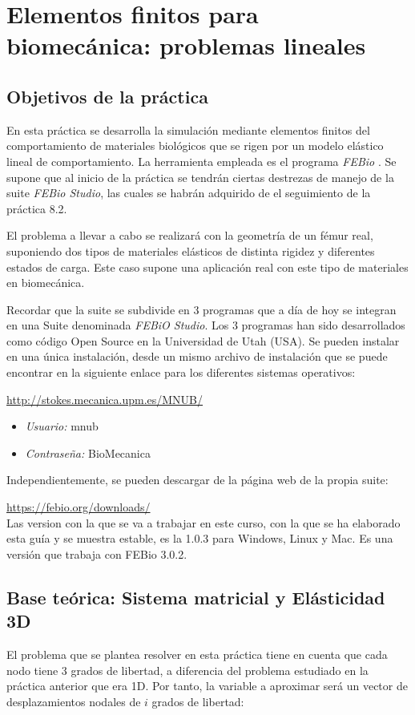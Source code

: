 \chapter{Elementos finitos para biomecánica: problemas lineales}
\label{cap2}

\section{Objetivos de la práctica}
\label{sec:objetivos}

En esta práctica se desarrolla la simulación mediante elementos finitos del comportamiento de materiales biológicos que se rigen por un modelo elástico lineal de comportamiento. La herramienta empleada es el programa \emph{FEBio} \cite{FEBiO}. Se supone que al inicio de la práctica se tendrán ciertas destrezas de manejo de la suite \emph{FEBio Studio}, las cuales se habrán adquirido de el seguimiento de la práctica 8.2. 

El problema a llevar a cabo se realizará con la geometría de un fémur real, suponiendo dos tipos de materiales elásticos de distinta rigidez y diferentes estados de carga. Este caso supone una aplicación real con este tipo de materiales en biomecánica. 

Recordar que la suite se subdivide en 3 programas que a día de hoy se integran en una Suite denominada \emph{FEBiO Studio}.  Los 3 programas han sido desarrollados como código Open Source en la Universidad de Utah (USA). Se pueden instalar en una única instalación, desde un mismo archivo de instalación que se puede encontrar en la siguiente enlace para los diferentes sistemas operativos:

\url{http://stokes.mecanica.upm.es/MNUB/}
\begin{itemize}
\item \emph{Usuario:} mnub
\item \emph{Contraseña:} BioMecanica
\end{itemize}

Independientemente, se pueden descargar de la página web de la propia suite:

\url{https://febio.org/downloads/}\\

Las version con la que se va a trabajar en este curso, con la que se ha elaborado esta guía y se muestra estable, es la 1.0.3 para Windows, Linux y Mac. Es una versión que trabaja con FEBio 3.0.2.

\section{Base teórica: Sistema matricial y Elásticidad 3D}
\label{sec:teoria}
El problema que se plantea resolver en esta práctica tiene en cuenta que cada nodo tiene 3 grados de libertad, a diferencia del problema estudiado en la práctica anterior que era 1D. Por tanto, la variable a aproximar será un vector de desplazamientos nodales de $i$ grados de libertad:

